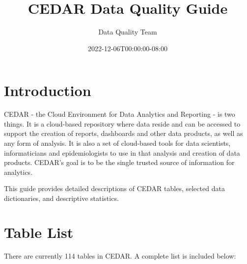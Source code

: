 \documentclass[
  letterpaper,
  DIV=11,
  numbers=noendperiod]{scrreprt}
\title{CEDAR Data Quality Guide}
\author{Data Quality Team}
\date{2022-12-06T00:00:00-08:00}
\renewcommand*\contentsname{Table of contents}
\newcommand\contentsname{Table of contents}
\begin{document}
\maketitle
\ifdefined\Shaded\renewenvironment{Shaded}{\begin{tcolorbox}[boxrule=0pt, frame hidden, borderline west={3pt}{0pt}{shadecolor}, enhanced, sharp corners, breakable, interior hidden]}{\end{tcolorbox}}\fi

\renewcommand*\contentsname{Table of contents}
{
\hypersetup{linkcolor=}
\setcounter{tocdepth}{2}
\tableofcontents
}

\hypertarget{introduction}{%
\chapter*{Introduction}\label{introduction}}

CEDAR - the Cloud Environment for Data Analytics and Reporting - is two
things. It is a cloud-based repository where data reside and can be
accessed to support the creation of reports, dashboards and other data
products, as well as any form of analysis. It is also a set of
cloud-based tools for data scientists, informaticians and
epidemiologists to use in that analysis and creation of data products.
CEDAR's goal is to be the single trusted source of information for
analytics.

This guide provides detailed descriptions of CEDAR tables, selected data
dictionaries, and descriptive statistics.


\hypertarget{table-list}{%
\chapter*{Table List}\label{table-list}}

There are currently 114 tables in CEDAR. A complete list is included
below:
\end{document}
